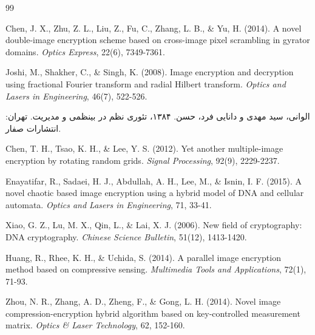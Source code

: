 \begin{thebibliography}{99}
\begin{LTRbibitems}
 Chen, J. X., Zhu, Z. L., Liu, Z., Fu, C., Zhang, L. B., \& Yu, H. (2014). A novel double-image encryption scheme based on cross-image pixel scrambling in gyrator domains. \textit{Optics Express}, 22(6), 7349-7361.
\end{LTRbibitems}

\begin{LTRbibitems}
 Joshi, M., Shakher, C., \& Singh, K. (2008). Image encryption and decryption using fractional Fourier transform and radial Hilbert transform. \textit{Optics and Lasers in Engineering}, 46(7), 522-526.
\end{LTRbibitems}

 الوانی، سید مهدی و دانایی فرد، حسن. ۱۳۸۴، تئوری نظم در بینظمی و مدیریت. تهران: انتشارات صفار.

\begin{LTRbibitems}
 Chen, T. H., Tsao, K. H., \& Lee, Y. S. (2012). Yet another multiple-image encryption by rotating random grids. \textit{Signal Processing}, 92(9), 2229-2237.
\end{LTRbibitems}

\begin{LTRbibitems}
 Enayatifar, R., Sadaei, H. J., Abdullah, A. H., Lee, M., \& Isnin, I. F. (2015). A novel chaotic based image encryption using a hybrid model of DNA and cellular automata. \textit{Optics and Lasers in Engineering}, 71, 33-41.
\end{LTRbibitems}

\begin{LTRbibitems}
 Xiao, G. Z., Lu, M. X., Qin, L., \& Lai, X. J. (2006). New field of cryptography: DNA cryptography. \textit{Chinese Science Bulletin}, 51(12), 1413-1420.
\end{LTRbibitems}

\begin{LTRbibitems}
 Huang, R., Rhee, K. H., \& Uchida, S. (2014). A parallel image encryption method based on compressive sensing. \textit{Multimedia Tools and Applications}, 72(1), 71-93.
\end{LTRbibitems}

\begin{LTRbibitems}
 Zhou, N. R., Zhang, A. D., Zheng, F., \& Gong, L. H. (2014). Novel image compression-encryption hybrid algorithm based on key-controlled measurement matrix. \textit{Optics \& Laser Technology}, 62, 152-160.
\end{LTRbibitems}


\end{thebibliography}
